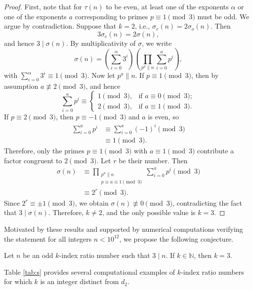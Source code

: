 \documentclass[12pt,reqno]{article}
\begin{document}
\begin{proof}
First, note that for $\tau(n)$ to be even, at least one of the exponents $\alpha$ or one of the exponents $a$ corresponding to primes $p \equiv 1 \pmod{3}$ must be odd. We argue by contradiction. Suppose that $k=2$, i.e., $\sigma_e(n)=2\sigma_o(n)$. Then
\[
3\sigma_e(n)=2\sigma(n),
\]
and hence $3 \mid \sigma(n)$.
By multiplicativity of $\sigma$, we write
\[
\sigma(n) = \left(\sum_{i=0}^{\alpha} 3^i \right)\left(\prod_{p^a \parallel n} \sum_{i=0}^{a} p^i \right),
\]
with $\sum_{i=0}^{\alpha} 3^i \equiv 1 \pmod{3}$.
Now let $p^a \parallel n$. If $p \equiv 1 \pmod{3}$, then by assumption $a \not\equiv 2 \pmod{3}$, and hence
\[
\sum_{i=0}^{a} p^i \equiv 
\begin{cases}
1 \pmod{3}, & \text{if } a \equiv 0 \pmod{3};\\
2 \pmod{3}, & \text{if } a \equiv 1 \pmod{3}.
\end{cases}
\]
If $p \equiv 2 \pmod{3}$, then $p \equiv -1 \pmod{3}$ and $a$ is even, so
\begin{align*}
\sum_{i=0}^{a} p^i& \equiv \sum_{i=0}^{a} (-1)^i\pmod{3}\\
& \equiv 1 \pmod{3}.
\end{align*}
Therefore, only the primes $p \equiv 1 \pmod{3}$ with $a \equiv 1 \pmod{3}$ contribute a factor congruent to $2 \pmod{3}$. Let $r$ be their number. Then
\begin{align*}
\sigma(n) &\equiv \prod_{\substack{p^a \parallel n \\  p\equiv a \equiv 1 \pmod{3}}} \sum_{i=0}^{a} p^i\pmod{3}
\\ &\equiv 2^r \pmod{3}.
\end{align*}
Since $2^r \equiv \pm 1 \pmod{3}$, we obtain $\sigma(n) \not\equiv 0 \pmod{3}$, contradicting the fact that $3 \mid \sigma(n)$.
Therefore, $k \neq 2$, and the only possible value is $k=3$.
\end{proof}

Motivated by these results and supported by numerical computations verifying the statement for all integers $n<10^{12}$, we propose the following conjecture.

\begin{conjecture}
Let $n$ be an odd $k$-index ratio number such that $3 \mid n$. If $k \in \mathbb{N}$, then $k=3$.
\end{conjecture}

\begin{remark}
Table \ref{tab:s} provides several computational examples of $k$-index ratio numbers for which $k$ is an integer distinct from $d_2$.
\end{remark}
\end{document}
